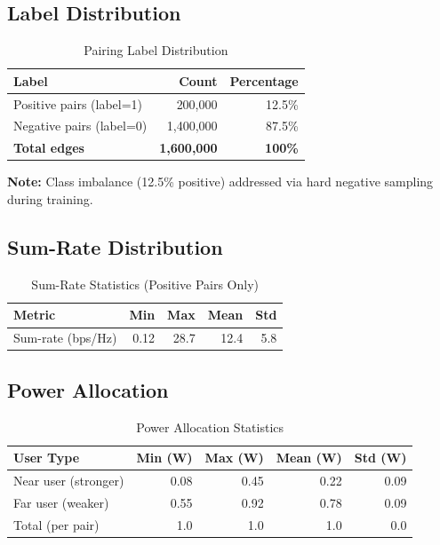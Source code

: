 \subsection{Label Distribution}

\begin{table}[H]
\centering
\begin{tabular}{lrr}
\toprule
\textbf{Label} & \textbf{Count} & \textbf{Percentage} \\
\midrule
Positive pairs (label=1) & 200,000 & 12.5\% \\
Negative pairs (label=0) & 1,400,000 & 87.5\% \\
\midrule
\textbf{Total edges} & \textbf{1,600,000} & \textbf{100\%} \\
\bottomrule
\end{tabular}
\caption{Pairing Label Distribution}
\end{table}

\textbf{Note:} Class imbalance (12.5\% positive) addressed via hard negative sampling during training.

\subsection{Sum-Rate Distribution}

\begin{table}[H]
\centering
\begin{tabular}{lrrrr}
\toprule
\textbf{Metric} & \textbf{Min} & \textbf{Max} & \textbf{Mean} & \textbf{Std} \\
\midrule
Sum-rate (bps/Hz) & 0.12 & 28.7 & 12.4 & 5.8 \\
\bottomrule
\end{tabular}
\caption{Sum-Rate Statistics (Positive Pairs Only)}
\end{table}

\subsection{Power Allocation}

\begin{table}[H]
\centering
\begin{tabular}{lrrrr}
\toprule
\textbf{User Type} & \textbf{Min (W)} & \textbf{Max (W)} & \textbf{Mean (W)} & \textbf{Std (W)} \\
\midrule
Near user (stronger) & 0.08 & 0.45 & 0.22 & 0.09 \\
Far user (weaker) & 0.55 & 0.92 & 0.78 & 0.09 \\
\midrule
Total (per pair) & 1.0 & 1.0 & 1.0 & 0.0 \\
\bottomrule
\end{tabular}
\caption{Power Allocation Statistics}
\end{table}

